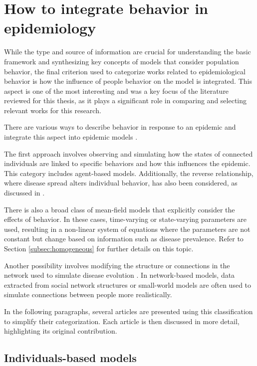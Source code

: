 \section{How to integrate behavior in epidemiology}
While the type and source of information are crucial for understanding the basic framework and synthesizing key concepts of models that consider population behavior, the final criterion used to categorize works related to epidemiological behavior is how the influence of people behavior on the model is integrated. This aspect is one of the most interesting and was a key focus of the literature reviewed for this thesis, as it plays a significant role in comparing and selecting relevant works for this research.

There are various ways to describe behavior in response to an epidemic and integrate this aspect into epidemic models \cite{Wang_2019, Bedson2021, Wang_2015_review}.

The first approach involves observing and simulating how the states of connected individuals are linked to specific behaviors and how this influences the epidemic. This category includes agent-based models. Additionally, the reverse relationship, where disease spread alters individual behavior, has also been considered, as discussed in \cite{Granell_2014}.

There is also a broad class of mean-field models that explicitly consider the effects of behavior. In these cases, time-varying or state-varying parameters are used, resulting in a non-linear system of equations where the parameters are not constant but change based on information such as disease prevalence. Refer to Section \ref{subsec:homogeneous} for further details on this topic.

Another possibility involves modifying the structure or connections in the network used to simulate disease evolution \cite{Peng2021}. In network-based models, data extracted from social network structures \cite{Carballosa_2021} or small-world models \cite{Turker_2023} are often used to simulate connections between people more realistically.

In the following paragraphs, several articles are presented using this classification to simplify their categorization. Each article is then discussed in more detail, highlighting its original contribution.

\subsection{Individuals-based models}
\label{subsec:individual_state}
